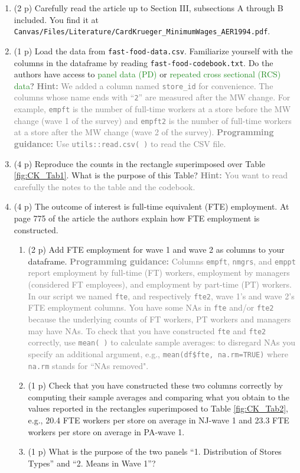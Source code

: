 \documentclass{article}
\begin{document}
\begin{enumerate}[label=\textbf{Q\arabic{enumi}}.,ref=Q\arabic{enumi}, wide=0pt, itemsep=0em, topsep=5pt, labelindent=0pt, resume]
\item (2 p) Carefully read the article up to Section III, subsections A through B included. You find it at \\ \texttt{Canvas/Files/Literature/CardKrueger\_MinimumWages\_AER1994.pdf}.
\item (1 p) Load the data from \texttt{fast-food-data.csv}. Familiarize yourself with the columns in the dataframe by reading \texttt{fast-food-codebook.txt}. Do the authors have access to \textcolor{ForestGreen}{panel data (PD)} or \textcolor{ForestGreen}{repeated cross sectional (RCS) data}? \textcolor{gray}{\textbf{Hint:} We added a column named \texttt{store\_id} for convenience. The columns whose name ends with ``\texttt{2}'' are measured after the MW change. For example, \texttt{empft} is the number of full-time workers at a store before the MW change (wave 1 of the survey) and \texttt{empft2} is the number of full-time workers at a store after the MW change (wave 2 of the survey).} \textcolor{gray}{\textbf{Programming guidance:} Use \texttt{utils::read.csv( )} to read the CSV file.}
\item (4 p) Reproduce the counts in the rectangle superimposed over Table \ref{fig:CK_Tab1}. What is the purpose of this Table? \textcolor{gray}{\textbf{Hint:} You want to read carefully the notes to the table and the codebook.}
\item (4 p) The outcome of interest is full-time equivalent (FTE) employment. At page 775 of the article the authors explain how FTE employment is constructed. 
\begin{enumerate}
\item (2 p) Add FTE employment for wave 1 and wave 2 as columns to your dataframe. \textcolor{gray}{\textbf{Programming guidance:} Columns \texttt{empft}, \texttt{nmgrs}, and \texttt{emppt} report employment by full-time (FT) workers, employment by managers (considered FT employees), and employment by part-time (PT) workers. In our script we named \texttt{fte}, and respectively \texttt{fte2}, wave 1's and wave 2's FTE employment columns. You have some NAs in \texttt{fte} and/or \texttt{fte2} because the underlying counts of FT workers, PT workers and managers may have NAs. To check that you have constructed \texttt{fte} and \texttt{fte2} correctly, use \texttt{mean( )} to calculate sample averages: to disregard NAs you specify an additional argument, e.g., \texttt{mean(df\$fte, na.rm=TRUE)} where \texttt{na.rm} stands for ``NAs removed".} 
\item (1 p) Check that you have constructed these two columns correctly by computing their sample averages and comparing what you obtain to the values reported in the rectangles superimposed to Table \ref{fig:CK_Tab2}, e.g., 20.4 FTE workers per store on average in NJ-wave 1 and 23.3 FTE workers per store on average in PA-wave 1. 
\item (1 p) What is the purpose of the two panels ``1. Distribution of Stores Types'' and ``2. Means in Wave 1''? 
\end{enumerate}


\end{enumerate}
\end{document}
